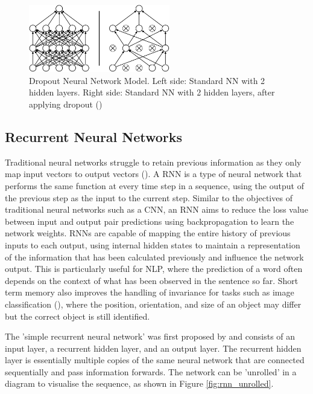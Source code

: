 \begin{figure}[ht!]
\centering
\includegraphics[width=0.55\textwidth]{media/literature/machine_learning/ml_dropout3.png}
\caption[Diagram of the Dropout Neural Network Model]{Dropout Neural Network Model. Left side: Standard \acrshort{NN} with 2 hidden layers. Right side: Standard \acrshort{NN} with 2 hidden layers, after applying dropout (\cite{srivastava_dropout_2014})}
\label{fig:cnn_dropout}
\end{figure}

\subsection{Recurrent Neural Networks}

Traditional neural networks struggle to retain previous information as they only map input vectors to output vectors (\cite{graves_supervised_2012}). A \acrfull{RNN} is a type of neural network that performs the same function at every time step in a sequence, using the output of the previous step as the input to the current step.
Similar to the objectives of traditional neural networks such as a \acrshort{CNN}, an \acrshort{RNN} aims to reduce the loss value between input and output pair predictions using backpropagation to learn the network weights. 
\acrshort{RNN}s are capable of mapping the entire history of previous inputs to each output, using internal hidden states to maintain a representation of the information that has been calculated previously and influence the network output.
This is particularly useful for \acrshort{NLP}, where the prediction of a word often depends on the context of what has been observed in the sentence so far. Short term memory also improves the handling of invariance for tasks such as image classification (\cite{mikolov_recurrent_slides_2010}), where the position, orientation, and size of an object may differ but the correct object is still identified. 

The 'simple recurrent neural network' was first proposed by \cite{elman_original_rnn_1990} and consists of an input layer, a recurrent hidden layer, and an output layer. The recurrent hidden layer is essentially multiple copies of the same neural network that are connected sequentially and pass information forwards. The network can be 'unrolled' in a diagram to visualise the sequence, as shown in Figure \ref{fig:rnn_unrolled}.

